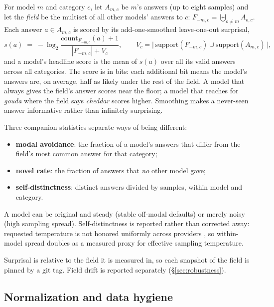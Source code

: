 \documentclass[11pt]{article}
\begin{document}
For model $m$ and category $c$, let $A_{m,c}$ be $m$'s answers (up to eight samples) and let the \emph{field} be the multiset of all other models' answers to $c$: $F_{-m,c} = \biguplus_{o \neq m} A_{o,c}$. Each answer $a \in A_{m,c}$ is scored by its add-one-smoothed leave-one-out surprisal,
\begin{equation}
s(a) \;=\; -\log_2 \frac{\mathrm{count}_{F_{-m,c}}(a) + 1}{\,|F_{-m,c}| + V_c\,},
\qquad V_c = \bigl|\,\mathrm{support}(F_{-m,c}) \cup \mathrm{support}(A_{m,c})\,\bigr|,
\end{equation}
and a model's headline score is the mean of $s(a)$ over all its valid answers across all categories. The score is in bits: each additional bit means the model's answers are, on average, half as likely under the rest of the field. A model that always gives the field's answer scores near the floor; a model that reaches for \emph{gouda} where the field says \emph{cheddar} scores higher. Smoothing makes a never-seen answer informative rather than infinitely surprising.

Three companion statistics separate ways of being different:
\begin{itemize}
\item \textbf{modal avoidance}: the fraction of a model's answers that differ from the field's most common answer for that category;
\item \textbf{novel rate}: the fraction of answers that \emph{no} other model gave;
\item \textbf{self-distinctness}: distinct answers divided by samples, within model and category.
\end{itemize}
A model can be original and steady (stable off-modal defaults) or merely noisy (high sampling spread). Self-distinctness is reported rather than corrected away: requested temperature is not honored uniformly across providers \citep{song2024greedy}, so within-model spread doubles as a measured proxy for effective sampling temperature.

Surprisal is relative to the field it is measured in, so each snapshot of the field is pinned by a git tag. Field drift is reported separately (\S\ref{sec:robustness}).

\subsection{Normalization and data hygiene}
\label{sec:normalization}
\end{document}
